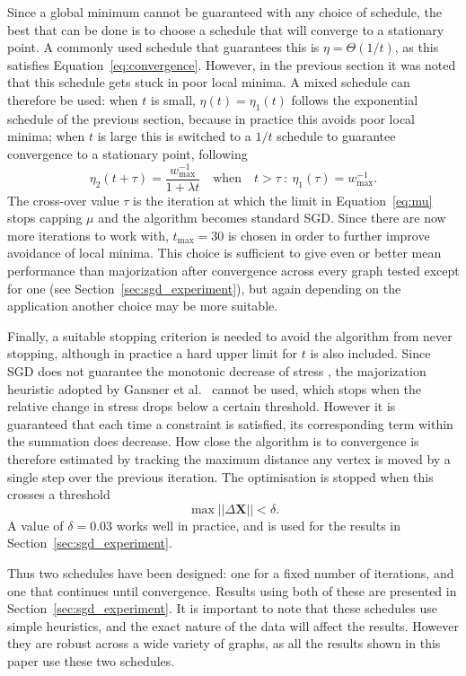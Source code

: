 Since a global minimum cannot be guaranteed with any choice of schedule, the best that can be done is to choose a schedule that will converge to a stationary point. A commonly used schedule that guarantees this is $\eta=\Theta(1/t)$, as this satisfies Equation~\eqref{eq:convergence}. However, in the previous section it was noted that this schedule gets stuck in poor local minima. A mixed schedule can therefore be used: when $t$ is small, $\eta(t)=\eta_1(t)$ follows the exponential schedule of the previous section, because in practice this avoids poor local minima; when $t$ is large this is switched to a $1/t$ schedule to guarantee convergence to a stationary point, following
\begin{equation}
  \eta_{2}(t + \tau) =
  \frac{w_{\max}^{-1}}{1+\lambda t}
  \quad \text{when}
  \quad t>\tau\: :\:
  \eta_{1}(\tau) = w_{\max}^{-1}.
\end{equation}
The cross-over value $\tau$ is the iteration at which the limit in Equation~\eqref{eq:mu} stops capping $\mu$ and the algorithm becomes standard SGD.
Since there are now more iterations to work with, $t_{\max}=30$ is chosen in order to further improve avoidance of local minima. This choice is sufficient to give even or better mean performance than majorization after convergence across every graph tested except for one (see Section~\ref{sec:sgd_experiment}), but again depending on the application another choice may be more suitable.

Finally, a suitable stopping criterion is needed to avoid the algorithm from never stopping, although in practice a hard upper limit for $t$ is also included. Since SGD does not guarantee the monotonic decrease of stress \cite{Darken1992}, the majorization heuristic adopted by Gansner et al.\ \cite{Gansner2004} cannot be used, which stops when the relative change in stress drops below a certain threshold.
However it is guaranteed that each time a constraint is satisfied, its corresponding term within the summation does decrease.
How close the algorithm is to convergence is therefore estimated by tracking the maximum distance any vertex is moved by a single step over the previous iteration. The optimisation is stopped when this crosses a threshold
\begin{equation}
  \max||\Delta\mathbf{X}|| < \delta.
\end{equation}
A value of $\delta=0.03$ works well in practice, and is used for the results in Section~\ref{sec:sgd_experiment}.

Thus two schedules have been designed: one for a fixed number of iterations, and one that continues until convergence.
Results using both of these are presented in Section~\ref{sec:sgd_experiment}.
It is important to note that these schedules use simple heuristics, and the exact nature of the data will affect the results.
However they are robust across a wide variety of graphs, as all the results shown in this paper use these two schedules.

